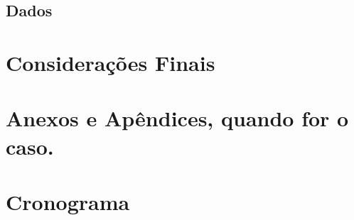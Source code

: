 \documentclass[12pt,oneside,a4paper,chapter=TITLE,english,brazil,sumario=abnt-6027-2012]{abntex2}
\begin{document}
\section{Dados}

\chapter{Considerações Finais}








\apendices

\chapter{Anexos e Apêndices, quando for o caso.}

\chapter{Cronograma}
\end{document}
